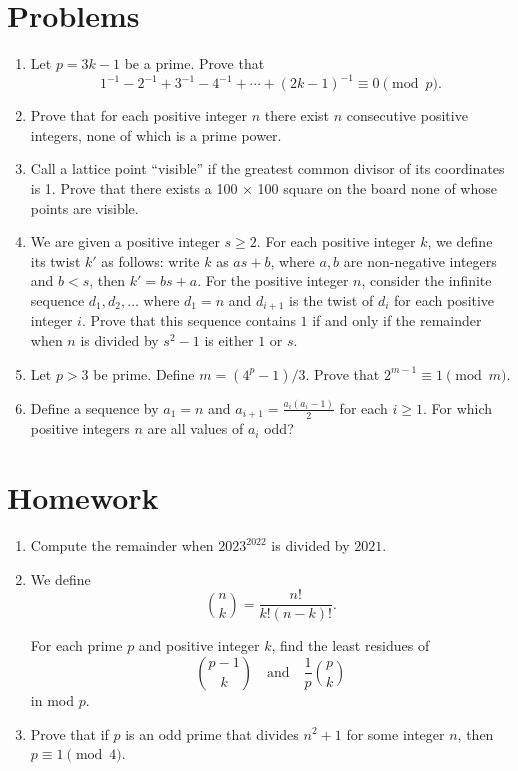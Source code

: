 \documentclass{article}
\begin{document}
\section{Problems}
\begin{enumerate}
  \item Let $p=3k-1$ be a prime. Prove that
    \[1^{-1}-2^{-1}+3^{-1}-4^{-1}+\cdots+(2k-1)^{-1}\equiv 0\pmod p.\]
  \item Prove that for each positive integer $n$ there exist $n$ consecutive
    positive integers, none of which is a prime power.
  \item Call a lattice point ``visible'' if the greatest
    common divisor of its coordinates is 1. Prove that there exists a 100 × 100
    square on the board none of whose points are visible.
  \item We are given a positive integer $s \ge 2$. For each positive integer
    $k$, we define its twist $k'$ as follows: write $k$ as $as+b$, where $a, b$
    are non-negative integers and $b < s$, then $k' = bs+a$. For the positive
    integer $n$, consider the infinite sequence $d_1, d_2, \dots$ where $d_1=n$
    and $d_{i+1}$ is the twist of $d_i$ for each positive integer $i$.
    Prove that this sequence contains $1$ if and only if the remainder when $n$
    is divided by $s^2-1$ is either $1$ or $s$.
  \item Let $p>3$ be prime. Define $m=(4^p-1)/3$. Prove that $2^{m-1}\equiv
    1\pmod m$.
  \item Define a sequence by $a_1=n$ and $a_{i+1}=\frac{a_i(a_i-1)}2$ for each
    $i\ge 1$. For which positive integers $n$ are all values of $a_i$ odd?
\end{enumerate}
\newpage
\section{Homework}
\begin{enumerate}
  \item Compute the remainder when $2023^{2022}$ is divided by $2021$.
  \item 
    We define
    \[\binom nk=\frac{n!}{k!(n-k)!}.\]

    For each prime $p$ and positive integer $k$, find the least residues of 
    \[\binom {p-1}k\quad\text{and}\quad\frac1p\binom pk\] in mod $p$.
  \item Prove that if $p$ is an odd prime that divides $n^2+1$ for some integer
    $n$, then $p\equiv 1\pmod 4$.
\end{enumerate}
\end{document}
